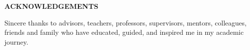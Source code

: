 \begin{centering}
\textbf{ACKNOWLEDGEMENTS}\\
\vspace{\baselineskip}
\end{centering}

Sincere thanks to advisors, teachers, professors, supervisors, mentors, colleagues, friends and family who have educated, guided, and inspired me in my academic journey.

